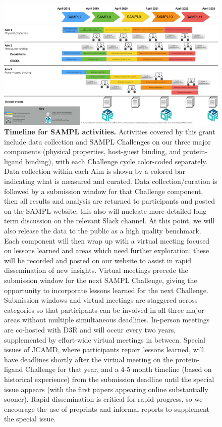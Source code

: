 \documentclass[11pt]{article}
\begin{document}
\begin{figure}[h]
\vspace{-0.10in}
\begin{centering}
\includegraphics[width=\textwidth]{figures/Timeline3_cropped.pdf}
\end{centering}
\vspace{-0.25in}
\caption{\footnotesize {\bf Timeline for SAMPL activities.} Activities covered by this grant include data collection and SAMPL Challenges on our three major components (physical properties, host-guest binding, and protein-ligand binding), with each Challenge cycle color-coded separately.  
Data collection within each Aim is shown by a colored bar indicating what is measured and curated.
Data collection/curation is followed by a submission window for that Challenge component, then all results and analysis are returned to participants and posted on the SAMPL website; this also will nucleate more detailed long-term discussion on the relevant Slack channel.
At this point, we will also release the data to the public as a high quality benchmark.
Each component will then wrap up with a virtual meeting focused on lessons learned and areas which need further exploration; these will be recorded and posted on our website to assist in rapid dissemination of new insights. 
Virtual meetings precede the submission window for the next SAMPL Challenge, giving the opportunity to incorporate lessons learned for the next Challenge.
Submission windows and virtual meetings are staggered across categories so that participants can be involved in all three major areas without multiple simultaneous deadlines.
In-person meetings are co-hosted with D3R and will occur every two years, supplemented by effort-wide virtual meetings in between.
Special issues of JCAMD, where participants report lessons learned, will have deadlines shortly after the virtual meeting on the protein-ligand Challenge for that year, and a 4-5 month timeline (based on historical experience) from the submission deadline until the special issue appears (with the first papers appearing online substantially sooner).
Rapid dissemination is critical for rapid progress, so we encourage the use of preprints and informal reports to supplement the special issue.
\vspace{-0.25in}
\label{figure:timeline}}
\end{figure}
\end{document}
